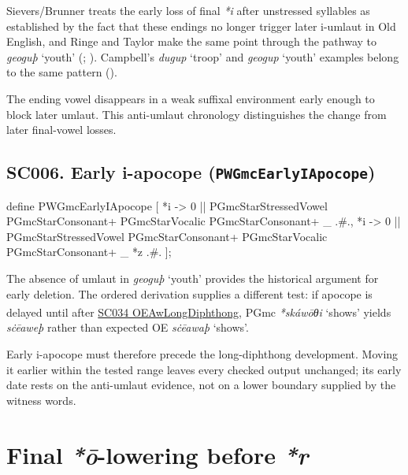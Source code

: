 \documentclass[
  british,
  a4paper,
  openany]{book}
\providecommand{\Pred}[1]{\textsuperscript{\dag}\emph{#1}}
\providecommand{\Recon}[1]{\emph{*#1}}
{\catcode`→=\active \global\def→{\ensuremath{\rightarrow}}}
\providecommand{\texorpdfstring}[2]{#1}
\providecommand{\Pred}[1]{\textsuperscript{\dag}\emph{#1}}
\providecommand{\Recon}[1]{\emph{*#1}}
{\catcode`→=\active \global\def→{\ensuremath{\rightarrow}}}
\begin{document}
Sievers/Brunner treats the early loss of final \emph{*i} after
unstressed syllables as established by the fact that these endings no
longer trigger later i-umlaut in Old English, and Ringe and Taylor make
the same point through the pathway to \emph{geoguþ} `youth'
(;
). Campbell's
\emph{dugup} `troop' and \emph{geogup} `youth' examples belong to the
same pattern ().

The ending vowel disappears in a weak suffixal environment early enough
to block later umlaut. This anti-umlaut chronology distinguishes the
change from later final-vowel losses.

\subsection{\texorpdfstring{SC006. Early i-apocope
(\texttt{PWGmcEarlyIApocope})}{SC006. Early i-apocope (PWGmcEarlyIApocope)}}\label{rule-PWGmcEarlyIApocope}

\begin{ReaderFacingFoma}
define PWGmcEarlyIApocope [
    {*i} -> 0 || PGmcStarStressedVowel PGmcStarConsonant+ PGmcStarVocalic PGmcStarConsonant+ _ .#.,
    {*i} -> 0 || PGmcStarStressedVowel PGmcStarConsonant+ PGmcStarVocalic PGmcStarConsonant+ _ {*z} .#.
];
\end{ReaderFacingFoma}

The absence of umlaut in \emph{geoguþ} `youth' provides the historical
argument for early deletion. The ordered derivation supplies a different
test: if apocope is delayed until after
\hyperref[rule-OEAwLongDiphthong]{SC034 OEAwLongDiphthong}, PGmc
\Recon{skáwōθi} `shows' yields \Pred{sċēaweþ} rather than expected OE
\emph{sċēawaþ} `shows'.

Early i-apocope must therefore precede the long-diphthong development.
Moving it earlier within the tested range leaves every checked output
unchanged; its early date rests on the anti-umlaut evidence, not on a
lower boundary supplied by the witness words.

\newpage

\section{\texorpdfstring{Final \emph{*ō}-lowering before
\emph{*r}}{Final -lowering before }}\label{final--lowering-before}
\end{document}
